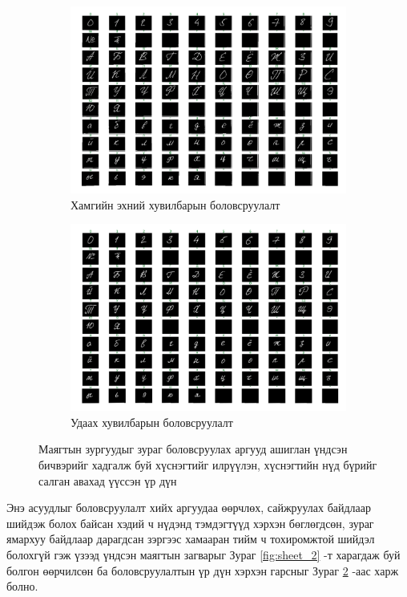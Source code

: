 \begin{figure}[H]
	\begin{subfigure}{0.5\textwidth}
		\includegraphics[width=0.9\linewidth]{images/sheet_1_segmented}
		\caption{Хамгийн эхний хувилбарын боловсруулалт}
		\label{fig:sheet_1_segmented}
	\end{subfigure}
	\begin{subfigure}{0.5\textwidth}
		\includegraphics[width=0.9\linewidth]{images/sheet_2_segmented}
		\caption{Удаах хувилбарын боловсруулалт}
		\label{fig:sheet_2_segmented}
	\end{subfigure}
	\caption{Маягтын зургуудыг зураг боловсруулах аргууд ашиглан үндсэн бичвэрийг хадгалж буй хүснэгтийг илрүүлэн, хүснэгтийн нүд бүрийг салган авахад үүссэн үр дүн}
	\label{fig:sheets_cropped}
\end{figure}

Энэ асуудлыг боловсруулалт хийх аргуудаа өөрчлөх, сайжруулах байдлаар шийдэж болох байсан хэдий ч нүдэнд тэмдэгтүүд хэрхэн бөглөгдсөн, зураг ямархуу байдлаар дарагдсан зэргээс хамааран тийм ч тохиромжтой шийдэл болохгүй гэж үзээд үндсэн маягтын загварыг Зураг \ref{fig:sheet_2} -т харагдаж буй болгон өөрчилсөн ба боловсруулалтын үр дүн хэрхэн гарсныг Зураг \ref{fig:sheet_2_segmented} -аас харж болно.

